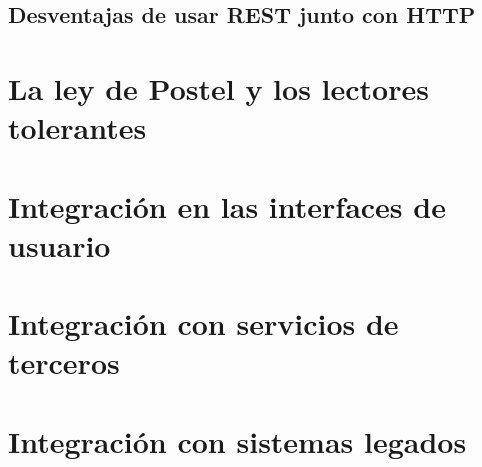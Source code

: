 \documentclass[11pt,a4paper]{article}
\begin{document}
\subsection{Desventajas de usar REST junto con HTTP}


\section{La ley de Postel y los lectores tolerantes}

\section{Integración en las interfaces de usuario}

\section{Integración con servicios de terceros}

\section{Integración con sistemas legados}
\end{document}
